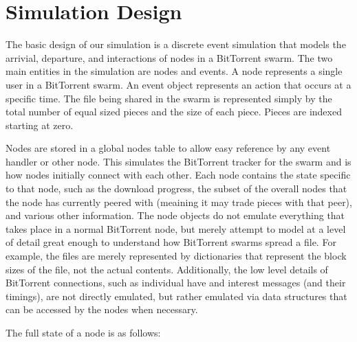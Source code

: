\section{Simulation Design}

The basic design of our simulation is a discrete event simulation
that models the arrivial, departure, and interactions of nodes in a
BitTorrent swarm. The two main entities in the simulation are nodes
and events. A node represents a single user in a BitTorrent swarm.
An event object represents an action that occurs at a specific time.
The file being shared in the swarm is represented simply by the total
number of equal sized pieces and the size of each piece. Pieces are
indexed starting at zero.

Nodes are stored in a global nodes table to allow easy reference by
any event handler or other node. This simulates the BitTorrent tracker
for the swarm and is how nodes initially connect with each other. Each
node contains the state specific to that node, such as the download
progress, the subset of the overall nodes that the node has currently
peered with (meaining it may trade pieces with that peer), and various
other information. The node objects do not emulate everything that takes
place in a normal BitTorrent node, but merely attempt to model at a
level of detail great enough to understand how BitTorrent swarms spread
a file. For example, the files are merely represented by dictionaries
that represent the block sizes of the file, not the actual contents.
Additionally, the low level details of BitTorrent connections, such
as individual have and interest messages (and their timings), are not
directly emulated, but rather emulated via data structures that can be
accessed by the nodes when necessary.

The full state of a node is as follows:


